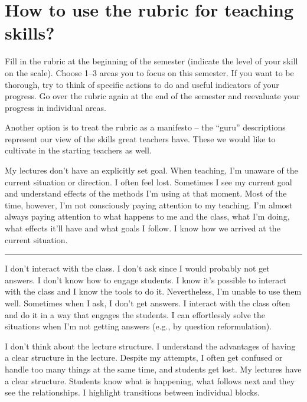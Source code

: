 \section*{How to use the rubric for teaching skills?}

Fill in the rubric at the beginning of the semester (indicate the level of your skill on the scale). Choose 1--3 areas you to focus on this semester. If you want to be thorough, try to think of specific actions to do and useful indicators of your progress. Go over the rubric again at the end of the semester and reevaluate your progress in individual areas.

Another option is to treat the rubric as a manifesto -- the \enquote{guru} descriptions represent our view of the skills great teachers have. These we would like to cultivate in the starting teachers as well.


\newpage
{}
{My lectures don't have an explicitly set goal. When teaching, I'm unaware of the current situation or direction. I often feel lost.}
{Sometimes I see my current goal and understand effects of the methods I'm using at that moment. Most of the time, however, I'm not consciously paying attention to my teaching.}
{I'm almost always paying attention to what happens to me and the class, what I'm doing, what effects it'll have and what goals I follow. I know how we arrived at the current situation.}

\rule{\textwidth}{0.4pt}
{I don't interact with the class. I don't ask since I would probably not get answers. I don't know how to engage students.}
{I know it's possible to interact with the class and I know the tools to do it. Nevertheless, I'm unable to use them well. Sometimes when I ask, I don't get answers.}
{I interact with the class often and do it in a way that engages the students. I can effortlessly solve the situations when I'm not getting answers (e.g., by question reformulation).}

\newpage
{}
{I don't think about the lecture structure.}
{I understand the advantages of having a clear structure in the lecture. Despite my attempts, I often get confused or handle too many things at the same time, and students get lost.}
{My lectures have a clear structure. Students know what is happening, what follows next and they see the relationships. I highlight transitions between individual blocks.}

